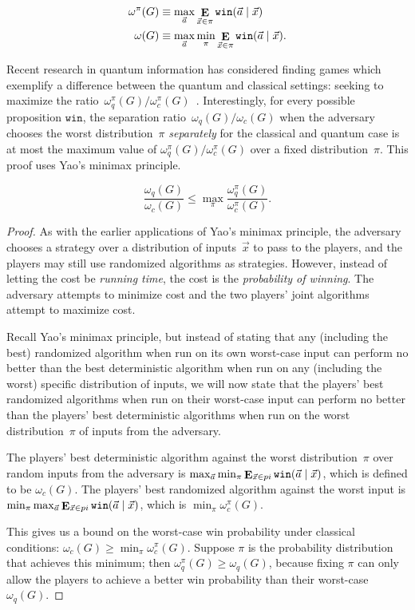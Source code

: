 \begin{align*}
	\omega^\pi(G) &\equiv \max_{\vec{a}} \mathop{\mathbf{E}}_{\vec{x} \in \pi} \texttt{win}(\vec{a}\nobreak\mid\nobreak\vec{x}) \\
	\omega(G) &\equiv \max_{\vec{a}} \min_\pi \mathop{\mathbf{E}}_{\vec{x} \in \pi} \texttt{win}(\vec{a}\nobreak\mid\nobreak\vec{x}).
\end{align*}

Recent research in quantum information has considered finding games which exemplify a difference between the quantum and classical settings: seeking to maximize the ratio~$\omega_q^\pi(G) / \omega_c^\pi(G)$~\cite{ABBSSV}. Interestingly, for every possible proposition $\texttt{win}$, the separation ratio~$\omega_q(G) / \omega_c(G)$ when the adversary chooses the worst distribution~$\pi$ \emph{separately} for the classical and quantum case is at most the maximum value of $\omega_q^\pi(G) / \omega_c^\pi(G)$ over a fixed distribution~$\pi$. This proof uses Yao's minimax principle.

\begin{theorem}
	$$\frac{\omega_q(G)}{\omega_c(G)} \leq \max_\pi \frac{\omega_q^\pi(G)}{\omega_c^\pi(G)}.$$
\end{theorem}

\begin{proof}

As with the earlier applications of Yao's minimax principle, the adversary chooses a strategy over a distribution of inputs~$\vec{x}$ to pass to the players, and the players may still use randomized algorithms as strategies. However, instead of letting the cost be \emph{running time}, the cost is the \emph{probability of winning}. The adversary attempts to minimize cost and the two players' joint algorithms attempt to maximize cost.

Recall Yao's minimax principle, but instead of stating that any (including the best) randomized algorithm when run on its own worst-case input can perform no better than the best deterministic algorithm when run on any (including the worst) specific distribution of inputs, we will now state that the players' best randomized algorithms when run on their worst-case input can perform no better than the players' best deterministic algorithms when run on the worst distribution~$\pi$ of inputs from the adversary.

The players' best deterministic algorithm against the worst distribution~$\pi$ over random inputs from the adversary is $\max_{\vec{a}} \min_{\pi} \mathop{\mathbf{E}}_{\vec{x} \in pi} \texttt{win}(\vec{a}\nobreak\mid\nobreak\vec{x})$, which is defined to be $\omega_c(G)$. The players' best randomized algorithm against the worst input is $\min_\pi \max_{\vec{a}} \mathop{\mathbf{E}}_{\vec{x} \in pi} \texttt{win}(\vec{a}\nobreak\mid\nobreak\vec{x})$, which is $\min_\pi \omega^\pi_c(G)$.

This gives us a bound on the worst-case win probability under classical conditions: $\omega_c(G) \geq \min_{\pi} \omega_c^\pi(G)$. Suppose $\pi$ is the probability distribution that achieves this minimum; then $\omega_q^\pi(G) \geq \omega_q(G)$, because fixing $\pi$ can only allow the players to achieve a better win probability than their worst-case $\omega_q(G)$.
\end{proof}

